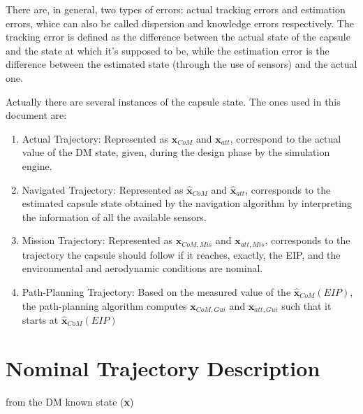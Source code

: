 There are, in general, two types of errors: actual tracking errors and estimation
errors, whice can also be called dispersion and knowledge errors respectively.
The tracking error is defined as the difference between the actual state of the capsule and the state
at which it's supposed to be, while the estimation error is the difference between the estimated state
(through the use of sensors) and the actual one.

Actually there are several instances of the capsule state. The ones used in this document are:

\begin{enumerate}
    \item Actual Trajectory: Represented as $\textbf{x}_{CoM}$ and $\textbf{x}_{att}$, correspond
    to the actual value of the DM state, given, during the design phase by the simulation engine.
    \item Navigated Trajectory: Represented as $\hat{\textbf{x}}_{CoM}$ and $\hat{\textbf{x}}_{att}$,
    corresponds to the estimated capsule state obtained by the navigation algorithm by interpreting the
    information of all the available sensors.
    \item Mission Trajectory: Represented as $\textbf{x}_{CoM,Mis}$ and $\textbf{x}_{att,Mis}$, corresponds to the trajectory
    the capsule should follow if it reaches, exactly, the EIP, and the environmental and aerodynamic conditions are nominal.
    \item Path-Planning Trajectory: Based on the measured value of the $\hat{\textbf{x}}_{CoM}(EIP)$, the path-planning 
    algorithm computes $\textbf{x}_{CoM,Gui}$ and $\textbf{x}_{att,Gui}$ such that it starts at $\hat{\textbf{x}}_{CoM}(EIP)$ 
\end{enumerate}

\newpage

\section{Nominal Trajectory Description}

from the DM known state (\textbf{x})